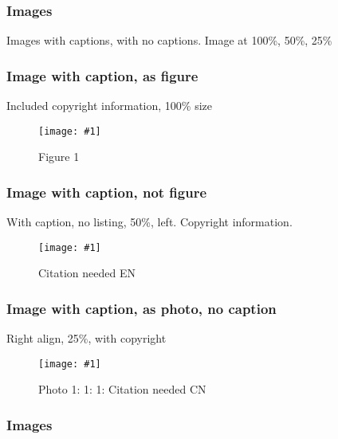 \documentclass{article}
\newlength{\imgwidth}
\newcommand\scaledgraphics[2]{%
                
\settowidth{\imgwidth}{\texttt{[image: \#1]}}%
                
\setlength{\imgwidth}{\minof{\imgwidth}{#2\textwidth}}%
                
\texttt{[image: \#1]}%
                
}
\begin{document}
\subsubsection{Images}\label{H607067}



Images with captions, with no captions. Image at 100\%, 50\%, 25\%


\subsubsection{Image with caption, as figure}\label{H415836}



Included copyright information, 100\% size

\begin{figure}
\scaledgraphics{2112cd94-9504-4ac8-a467-c996ced73408.jpg}{1}
\caption*{Figure 1}\label{F27135281}
\end{figure}


\subsubsection{Image with caption, not figure}\label{H9577977}



With caption, no listing, 50\%, left. Copyright information.

\begin{wrapfigure}{l}{0.5\textwidth}
\scaledgraphics{d2133ec1-3584-435f-ae11-585197fe8785.jpg}{0.5}
\caption*{Citation needed EN}\label{F35988861}
\end{wrapfigure}


\subsubsection{Image with caption, as photo, no caption}\label{H166321}



Right align, 25\%, with copyright

\begin{wrapfigure}{r}{0.25\textwidth}
\scaledgraphics{4610ab2c-b384-45c6-bea8-45345ff23871.png}{0.25}
\caption*{Photo 1:  1:  1: Citation needed CN}\label{F40137711}
\end{wrapfigure}


\subsubsection{Images}\label{H1357540}
\end{document}

